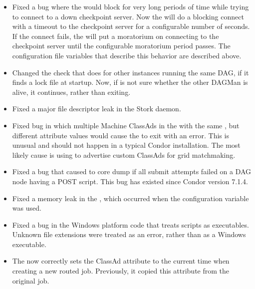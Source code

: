 \begin{itemize}

\item Fixed a bug where the  would block for very long
periods of time while trying to connect to a down checkpoint server. Now
the  will do a blocking connect with a timeout to the
checkpoint server for a configurable number of seconds. If the connect
fails, the  will put a moratorium on connecting to the
checkpoint server until the configurable moratorium period passes. The
configuration file variables that describe this behavior are described
above.

\item Changed the check that  does for other
 instances
running the same DAG, if it finds a lock file at startup.
Now, if  is not sure whether the other DAGMan is alive,
it continues, rather than exiting.

\item Fixed a major file descriptor leak in the Stork daemon.

\item Fixed bug in which multiple Machine ClassAds in the
 with the same ,
but different  attribute values
would cause the  to exit with an error.
This is unusual and should not happen in a typical Condor installation.
The most likely cause is using 
to advertise custom ClassAds for grid matchmaking.

\item Fixed a bug that caused  to core dump if all
submit attempts failed on a DAG node having a POST script.
This bug has existed since Condor version 7.1.4.

\item Fixed a memory leak in the , which occurred when
the configuration variable  was used.

\item Fixed a bug in the Windows platform code that treats scripts as
  executables.
  Unknown file extensions were treated as an error,
  rather than as a Windows executable.

\item The  now correctly sets the ClassAd attribute
 to the current time when creating a new routed job.
Previously, it copied this attribute from the original job.


\end{itemize}
